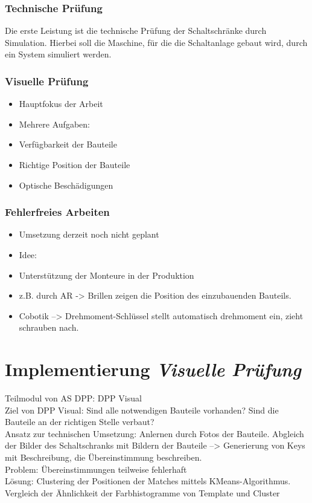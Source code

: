\documentclass[
    type=Projektarbeit,
    status=draft, %
    language=german, %
    bibengine=bibtex,
]{unibwm-inf-thesis}
\begin{document}
    \subsection{Technische Prüfung}
    Die erste Leistung ist die technische Prüfung der Schaltschränke durch Simulation.
    Hierbei soll die Maschine, für die die Schaltanlage gebaut wird, durch ein System simuliert werden.
    
    \subsection{Visuelle Prüfung}
    \begin{itemize}
        \item Hauptfokus der Arbeit
        \item Mehrere Aufgaben:
        \item Verfügbarkeit der Bauteile
        \item Richtige Position der Bauteile
        \item Optische Beschädigungen
    \end{itemize}


    \subsection{Fehlerfreies Arbeiten}
    \begin{itemize}
        \item Umsetzung derzeit noch nicht geplant
        \item Idee:
        \item Unterstützung der Monteure in der Produktion
        \item z.B. durch AR -> Brillen zeigen die Position des einzubauenden Bauteils.
        \item Cobotik --> Drehmoment-Schlüssel stellt automatisch drehmoment ein, zieht schrauben nach.
    \end{itemize}



    \chapter{Implementierung \textit{Visuelle Prüfung}}
    Teilmodul von AS DPP: DPP Visual\\
    Ziel von DPP Visual: Sind alle notwendigen Bauteile vorhanden?
    Sind die Bauteile an der richtigen Stelle verbaut?\\
    Ansatz zur technischen Umsetzung: Anlernen durch Fotos der Bauteile.
    Abgleich der Bilder des Schaltschranks mit Bildern der Bauteile --> Generierung von Keys mit Beschreibung, die
    Übereinstimmung beschreiben.\\
    Problem: Übereinstimmungen teilweise fehlerhaft \\
    Lösung: Clustering der Positionen der Matches mittels KMeans-Algorithmus.
    Vergleich der Ähnlichkeit der Farbhistogramme von Template und Cluster
\end{document}
